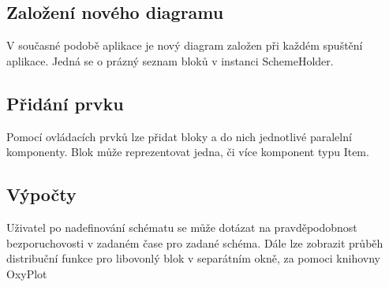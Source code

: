\documentclass[FM,RP]{tulthesis}
\begin{document}
    \subsection*{Založení nového diagramu}
        V současné podobě aplikace je nový diagram založen při každém spuštění aplikace. Jedná se o prázný seznam bloků v instanci SchemeHolder.
    \subsection*{Přidání prvku}
        Pomocí ovládacích prvků lze přidat bloky a do nich jednotlivé paralelní komponenty. 
        Blok může reprezentovat jedna, či více komponent typu Item.
    \subsection*{Výpočty}
        Uživatel po nadefinování schématu se může dotázat na pravděpodobnost bezporuchovosti v zadaném čase pro zadané schéma.
        Dále lze zobrazit průběh distribuční funkce pro libovonlý blok v separátním okně, za pomoci knihovny OxyPlot \cite{15}
\end{document}
